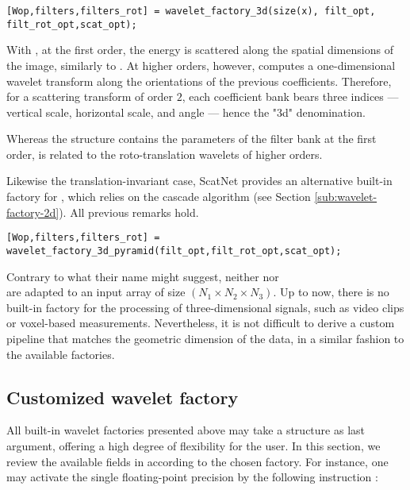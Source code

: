 \documentclass{article}
\begin{document}
\begin{lstlisting}
[Wop,filters,filters_rot] = wavelet_factory_3d(size(x), filt_opt, filt_rot_opt,scat_opt);
\end{lstlisting}

With , at the first order, the energy is scattered along the spatial dimensions of the image, similarly to . At higher orders, however,  computes a one-dimensional wavelet transform along the orientations of the previous coefficients. Therefore, for a scattering transform of order $2$, each coefficient bank bears three indices — vertical scale, horizontal scale, and angle — hence the "3d" denomination.

Whereas the structure  contains the parameters of the filter bank at the first order,  is related to the roto-translation wavelets of higher orders.

Likewise the translation-invariant case, ScatNet provides an alternative built-in factory for , which relies on the cascade algorithm (see Section \ref{sub:wavelet-factory-2d}). All previous remarks hold.

\begin{lstlisting}
[Wop,filters,filters_rot] = wavelet_factory_3d_pyramid(filt_opt,filt_rot_opt,scat_opt);
\end{lstlisting}

Contrary to what their name might suggest, neither  nor \\
 are adapted to an input array  of size $(N_1 \times N_2 \times N_3)$. Up to now, there is no built-in factory for the processing of three-dimensional signals, such as video clips or voxel-based measurements. Nevertheless, it is not difficult to derive a custom pipeline that matches the geometric dimension of the data, in a similar fashion to the available factories.

\subsection{Customized wavelet factory \label{sub:scattering-options}}
All built-in wavelet factories presented above may take a structure  as last argument, offering a high degree of flexibility for the user. In this section, we review the available fields in  according to the chosen factory. For instance, one may activate the single floating-point precision by the following instruction :
\end{document}

